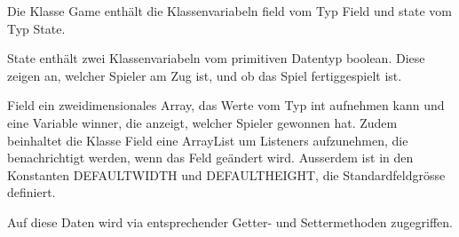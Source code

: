 Die Klasse Game enthält die Klassenvariabeln field 
vom Typ Field und state vom Typ State. 

State enthält zwei Klassenvariabeln vom primitiven 
Datentyp boolean. Diese zeigen an, welcher Spieler 
am Zug ist, und ob das Spiel fertiggespielt ist. 

Field ein zweidimensionales Array, das Werte vom Typ 
int aufnehmen kann und eine Variable winner, die 
anzeigt, welcher Spieler gewonnen hat. Zudem beinhaltet
die Klasse Field eine ArrayList um Listeners aufzunehmen, 
die benachrichtigt werden, wenn das Feld geändert wird. 
Ausserdem ist in den Konstanten DEFAULTWIDTH und DEFAULTHEIGHT, 
die Standardfeldgrösse definiert. 

Auf diese Daten wird via entsprechender Getter- und 
Settermethoden zugegriffen. 
